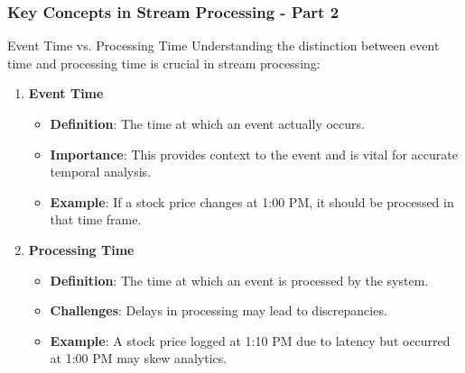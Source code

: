 \documentclass[aspectratio=169]{beamer}
\begin{document}
\begin{frame}[fragile]
    \frametitle{Key Concepts in Stream Processing - Part 2}
    \begin{block}{Event Time vs. Processing Time}
        Understanding the distinction between event time and processing time is crucial in stream processing:
        \begin{enumerate}
            \item \textbf{Event Time}
            \begin{itemize}
                \item \textbf{Definition}: The time at which an event actually occurs.
                \item \textbf{Importance}: This provides context to the event and is vital for accurate temporal analysis.
                \item \textbf{Example}: If a stock price changes at 1:00 PM, it should be processed in that time frame.
            \end{itemize}
            
            \item \textbf{Processing Time}
            \begin{itemize}
                \item \textbf{Definition}: The time at which an event is processed by the system.
                \item \textbf{Challenges}: Delays in processing may lead to discrepancies.
                \item \textbf{Example}: A stock price logged at 1:10 PM due to latency but occurred at 1:00 PM may skew analytics.
            \end{itemize}
        \end{enumerate}
    \end{block}
\end{frame}
\end{document}
